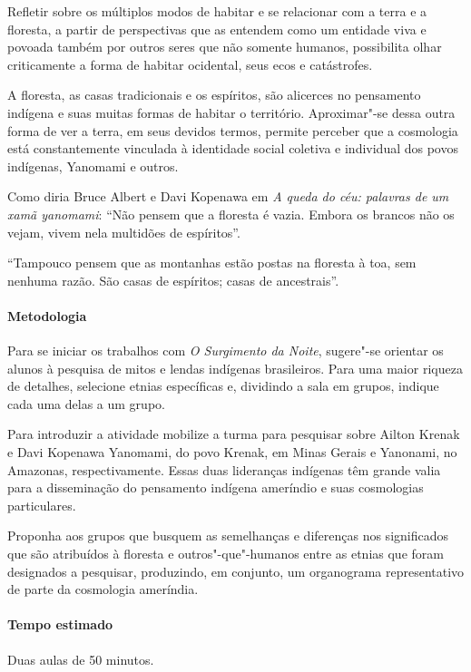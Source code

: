 \documentclass[12pt]{extarticle}
\begin{document}
{Refletir sobre os múltiplos modos de habitar e se relacionar com a terra e 
a floresta, a partir de perspectivas que as entendem como um entidade
viva e povoada também por outros seres que não somente humanos, possibilita
olhar criticamente a forma de habitar ocidental, seus ecos e catástrofes.

A floresta, as casas tradicionais e os espíritos, são alicerces no pensamento 
indígena e suas muitas formas de habitar o território. Aproximar"-se dessa outra
forma de ver a terra, em seus devidos termos, permite perceber que a cosmologia 
está constantemente vinculada à identidade social coletiva e individual dos povos
indígenas, Yanomami e outros. 


Como diria Bruce Albert e Davi Kopenawa em \textit{A queda do céu: palavras de 
um xamã yanomami}: ``Não pensem que a floresta é vazia. Embora os brancos não os 
vejam, vivem nela multidões de espíritos''.

``Tampouco pensem que as montanhas estão postas na floresta à toa, sem nenhuma razão. 
São casas de espíritos; casas de ancestrais''.

\paragraph{Metodologia} 


Para se iniciar os trabalhos com \emph{O Surgimento
da Noite}, sugere"-se orientar os alunos à pesquisa de mitos e lendas
indígenas brasileiros. Para uma maior riqueza de detalhes, selecione
etnias específicas e, dividindo a sala em grupos, indique cada uma delas
a um grupo. 

Para introduzir a atividade mobilize a turma para pesquisar sobre Ailton 
Krenak e Davi Kopenawa Yanomami, do povo Krenak, em Minas Gerais e Yanonami,
no Amazonas, respectivamente. Essas duas lideranças indígenas têm grande valia 
para a disseminação do pensamento indígena ameríndio e suas cosmologias particulares.

Proponha aos grupos que busquem as semelhanças e diferenças nos significados que são 
atribuídos à floresta e outros"-que"-humanos entre as etnias que foram designados a pesquisar,
produzindo, em conjunto, um organograma representativo de parte da cosmologia ameríndia.  



\paragraph{Tempo estimado} Duas aulas de 50 minutos. 


}
\end{document}
